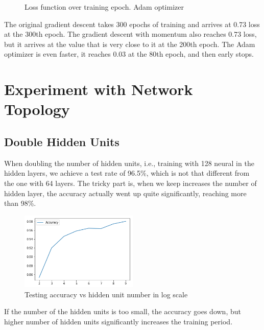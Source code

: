 \documentclass{article}
\begin{document}
\begin{figure}[h]
\begin{minipage}{0.3\textwidth}
	\caption{Loss function over training epoch. Adam optimizer}
	\end{minipage}
\end{figure}

The original gradient descent takes 300 epochs of training and arrives at 0.73 loss at the 300th epoch. The gradient descent with momentum also reaches 0.73 loss, but it arrives at the value that is very close to it at the 200th epoch. The Adam optimizer is even faster, it reaches 0.03 at the 80th epoch, and then early stops.


\newpage
\section{Experiment with Network Topology}
\subsection{Double Hidden Units}
When doubling the number of hidden units, i.e., training with 128 neural in the hidden layers, we achieve a test rate of 96.5\%, which is not that different from the one with 64 layers. The tricky part is, when we keep increases the number of hidden layer, the accuracy actually went up quite significantly, reaching more than 98\%.
\begin{figure}[h]
\centering
\includegraphics[width=0.5\textwidth]{pics/acc_hidden.png}
\caption{Testing accuracy vs hidden unit number in log scale}
\end{figure}
If the number of the hidden units is too small, the accuracy goes down, but higher number of hidden units significantly increases the training period.
\end{document}

